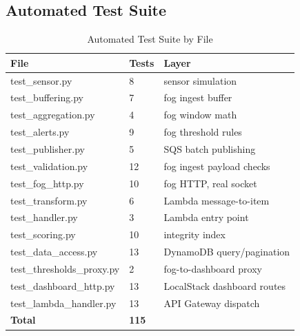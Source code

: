 \documentclass[conference]{IEEEtran}
\begin{document}
\subsection{Automated Test Suite}

\begin{table}[!t]
\caption{Automated Test Suite by File}
\label{tab:tests}
\centering
\footnotesize
\begin{tabular}{p{1.55in}p{0.35in}p{1.0in}}
\hline
\textbf{File} & \textbf{Tests} & \textbf{Layer} \\
\hline
test\_sensor.py & 8 & sensor simulation \\
test\_buffering.py & 7 & fog ingest buffer \\
test\_aggregation.py & 4 & fog window math \\
test\_alerts.py & 9 & fog threshold rules \\
test\_publisher.py & 5 & SQS batch publishing \\
test\_validation.py & 12 & fog ingest payload checks \\
test\_fog\_http.py & 10 & fog HTTP, real socket \\
test\_transform.py & 6 & Lambda message-to-item \\
test\_handler.py & 3 & Lambda entry point \\
test\_scoring.py & 10 & integrity index \\
test\_data\_access.py & 13 & DynamoDB query/pagination \\
test\_thresholds\_proxy.py & 2 & fog-to-dashboard proxy \\
test\_dashboard\_http.py & 13 & LocalStack dashboard routes \\
test\_lambda\_handler.py & 13 & API Gateway dispatch \\
\hline
\textbf{Total} & \textbf{115} & \\
\hline
\end{tabular}
\end{table}
\end{document}
